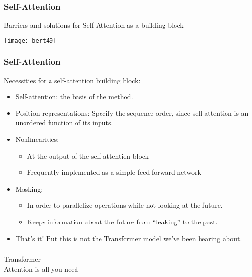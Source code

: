 \begin{frame}[fragile]\frametitle{Self-Attention}

Barriers and solutions for Self-Attention as a building block

\begin{center}
\texttt{[image: bert49]}
\end{center}	

 
\end{frame}

\begin{frame}[fragile]\frametitle{Self-Attention}

Necessities for a self-attention building block:

\begin{itemize}
\item Self-attention:
the basis of the method.
\item Position representations:
Specify the sequence order, since self-attention is an unordered function of its  inputs.
\item Nonlinearities:
\begin{itemize}
\item At the output of the self-attention block
\item Frequently implemented as a simple feed-forward network.
\end{itemize}	 

\item Masking:
\begin{itemize}
\item In order to parallelize operations while not looking at the future.
\item Keeps information about the future from “leaking” to the past.
\end{itemize}	 

\item That’s it! But this is not the Transformer model we’ve been hearing about.


\end{itemize}	 

 
\end{frame}

\begin{frame}[fragile]\frametitle{}
\begin{center}
{\Large Transformer \\ \small Attention is all you need}
\end{center}
\end{frame}


